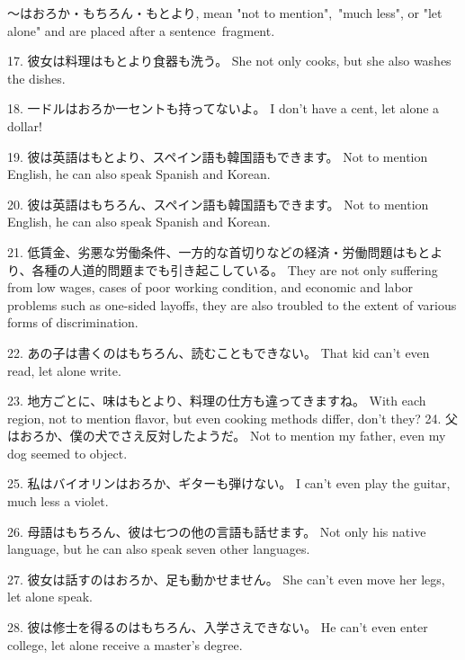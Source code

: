 \par{ ～はおろか・もちろん・もとより, mean "not to mention", "much less", or "let alone" and are placed after a sentence fragment. }

\par{17. 彼女は料理はもとより食器も洗う。 \hfill\break
She not only cooks, but she also washes the dishes. }

\par{18. 一ドルはおろか一セントも持ってないよ。 \hfill\break
I don't have a cent, let alone a dollar! }

\par{19. 彼は英語はもとより、スペイン語も韓国語もできます。 \hfill\break
Not to mention English, he can also speak Spanish and Korean. }

\par{20. 彼は英語はもちろん、スペイン語も韓国語もできます。 \hfill\break
Not to mention English, he can also speak Spanish and Korean. }

\par{21. 低賃金、劣悪な労働条件、一方的な首切りなどの経済・労働問題はもとより、各種の人道的問題までも引き起こしている。 \hfill\break
They are not only suffering from low wages, cases of poor working condition, and economic and labor problems such as one-sided layoffs, they are also troubled to the extent of various forms of discrimination. }

\par{22. あの子は書くのはもちろん、読むこともできない。 \hfill\break
That kid can't even read, let alone write. }

\par{23. 地方ごとに、味はもとより、料理の仕方も違ってきますね。 \hfill\break
With each region, not to mention flavor, but even cooking methods differ, don't they? }
24. 父はおろか、僕の犬でさえ反対したようだ。 \hfill\break
Not to mention my father, even my dog seemed to object. 
\par{25. 私はバイオリンはおろか、ギターも弾けない。 \hfill\break
I can't even play the guitar, much less a violet. }

\par{26. 母語はもちろん、彼は七つの他の言語も話せます。 \hfill\break
Not only his native language, but he can also speak seven other languages. }

\par{27. 彼女は話すのはおろか、足も動かせません。 \hfill\break
She can't even move her legs, let alone speak. }

\par{28. 彼は修士を得るのはもちろん、入学さえできない。 \hfill\break
He can't even enter college, let alone receive a master's degree. }

